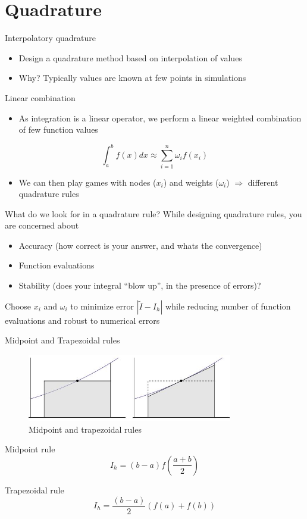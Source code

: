 \documentclass[presentation]{beamer}
\newcommand{\abs}[1]{\left\lvert#1\right\rvert}
\begin{document}
\section{Quadrature}
\label{sec:org7fbcb5d}
\begin{frame}[label={sec:org7048947}]{Interpolatory quadrature}
\begin{itemize}
\item Design a quadrature method based on interpolation of values
\item \alert{Why?} Typically values are known at few points in simulations
\end{itemize}
\begin{block}{Linear combination}
\begin{itemize}
\item As integration is a linear operator, we perform a linear weighted
combination of few function values
\end{itemize}
\[ \int_{a}^{b} f(x) dx \approx \sum_{i=1}^{n} \omega_i f(x_i) \]
\begin{itemize}
\item We can then play games with \alert{nodes} (\(x_i\)) and \alert{weights} (\(\omega_i\))
\(\Rightarrow\) different quadrature rules
\end{itemize}
\end{block}
\end{frame}
\begin{frame}[label={sec:orgd9b0caa}]{What do we look for in a quadrature rule?}
While designing quadrature rules, you are concerned about
\begin{itemize}
\item Accuracy (how correct is your answer, and whats the convergence)
\item Function evaluations
\item Stability (does your integral ``blow up'', in the presence of errors)?
\end{itemize}

Choose \(x_i\) and \(\omega_i\) to minimize error \(\abs{\tilde{I} -I_h }\) while reducing number of function evaluations and robust to numerical errors
\end{frame}
\begin{frame}[label={sec:orgd6b6e88}]{Midpoint and Trapezoidal rules}
\begin{figure}[htbp]
\centering
\includegraphics[width=0.8\textwidth]{images/midpoint.jpg}
\caption{Midpoint and trapezoidal rules}
\end{figure}
\begin{block}{Midpoint rule}
\[ I_h = (b-a) f \left( \frac{a + b}{2} \right) \]
\end{block}
\begin{block}{Trapezoidal rule}
\[ I_h = \frac{(b-a)}{2} \left( f(a) + f(b) \right) \]
\end{block}
\end{frame}
\end{document}
